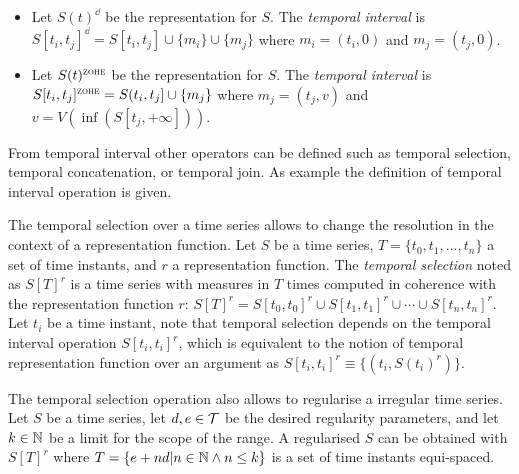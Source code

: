 \begin{itemize}
\item Let $S(t)^\dd$ be the \dd{} representation for $S$. The
  \emph{\dd{} temporal interval} is $S[t_i,t_j]^\dd = S[t_i,t_j]
  \cup \{m_i\} \cup \{m_j\}$ where $m_i=(t_i,0)$ and $m_j=(t_j,0)$.

\item Let $S(t)^\zohe{}$ be the \zohe{} representation for $S$. The
  \emph{\zohe{} temporal interval} is $S[t_i,t_j]^\zohe{} = S(t_i,t_j]
  \cup \{m_j\}$ where $m_j=(t_j,v)$ and $v= V(\inf( S[t_j,+\infty] ))$.
\end{itemize}



From temporal interval other operators can be defined such as temporal
selection, temporal concatenation, or temporal join. As example the
definition of temporal interval operation is given.


The temporal selection over a time series allows to change the
resolution in the context of a representation function.  Let $S$ be a
time series, $T=\{t_0,t_1,\dotsc,t_n\}$ a set of time instants, and
$r$ a representation function. The \emph{temporal selection} noted as
$S[T]^r$ is a time series with measures in $T$ times computed in
coherence with the representation function $r$: $S[T]^r = S[t_0,t_0]^r
\cup S[t_1,t_1]^r \cup \dotsb \cup S[t_n,t_n]^r$. Let $t_i$ be a time
instant, note that temporal selection depends on the temporal interval
operation $S[t_i,t_i]^r$, which is equivalent to the notion of
temporal representation function over an argument as $S[t_i,t_i]^r
\equiv \{ (t_i, S(t_i)^r) \}$.



The temporal selection operation also allows to regularise a irregular
time series. Let $S$ be a time series, let $d,e\in\cal{T}$ be the
desired regularity parameters, and let $k\in\mathbb{N}$ be a limit for the
scope of the range.  A regularised $S$ can be obtained with $S[T]^r$
where $T = \{e+nd | n\in\mathbb{N} \wedge n\leq k \}$ is a set of time
instants equi-spaced.





%
%


